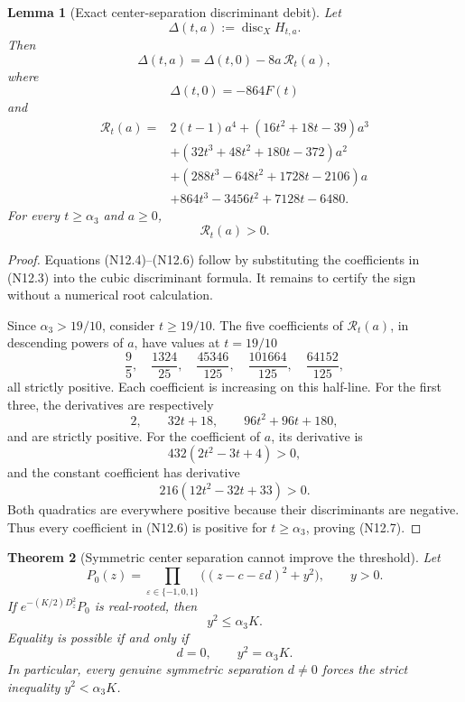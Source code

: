 \documentclass[11pt]{article}
\newtheorem{theorem}{Theorem}[section]
\newtheorem{lemma}[theorem]{Lemma}
\theoremstyle{definition}
\theoremstyle{remark}
\begin{document}
\begin{lemma}[Exact center-separation discriminant debit]
\label{lem:f2v12-debit}
Let
\[
 \Delta(t,a):=\operatorname{disc}_X H_{t,a}.
\]
Then
\[
 \boxed{
 \Delta(t,a)=\Delta(t,0)-8a\,\mathcal R_t(a),}
 \tag{N12.4}
\]
where
\[
 \Delta(t,0)=-864F(t)
 \tag{N12.5}
\]
and
\[
\begin{aligned}
 \mathcal R_t(a)={}&2(t-1)a^4
 +(16t^2+18t-39)a^3\\
 &+(32t^3+48t^2+180t-372)a^2\\
 &+(288t^3-648t^2+1728t-2106)a\\
 &+864t^3-3456t^2+7128t-6480.
\end{aligned}
\tag{N12.6}
\]
For every \(t\ge\alpha_3\) and \(a\ge0\),
\[
 \mathcal R_t(a)>0.
 \tag{N12.7}
\]
\end{lemma}

\begin{proof}
Equations \textup{(N12.4)}--\textup{(N12.6)} follow by substituting
the coefficients in \textup{(N12.3)} into the cubic discriminant formula.
It remains to certify the sign without a numerical root calculation.

Since \(\alpha_3>19/10\), consider \(t\ge19/10\).  The five coefficients
of \(\mathcal R_t(a)\), in descending powers of \(a\), have values at
\(t=19/10\)
\[
 \frac95,\quad
 \frac{1324}{25},\quad
 \frac{45346}{125},\quad
 \frac{101664}{125},\quad
 \frac{64152}{125},
 \tag{N12.8}
\]
all strictly positive.  Each coefficient is increasing on this half-line.  For the first three,
the derivatives are respectively
\[
 2,\qquad 32t+18,\qquad 96t^2+96t+180,
\]
and are strictly positive.  For the coefficient of \(a\), its derivative
is
\[
 432(2t^2-3t+4)>0,
\]
and the constant coefficient has derivative
\[
 216(12t^2-32t+33)>0.
\]
Both quadratics are everywhere positive because their discriminants are
negative.  Thus every coefficient in \textup{(N12.6)} is positive for
\(t\ge\alpha_3\), proving \textup{(N12.7)}.
\end{proof}

\begin{theorem}[Symmetric center separation cannot improve the threshold]
\label{thm:f2v12-separated}
Let
\[
 P_0(z)=
 \prod_{\varepsilon\in\{-1,0,1\}}
 \bigl((z-c-\varepsilon d)^2+y^2\bigr),
 \qquad y>0.
 \tag{N12.9}
\]
If \(e^{-(K/2)D_z^2}P_0\) is real-rooted, then
\[
 \boxed{y^2\le\alpha_3K.}
 \tag{N12.10}
\]
Equality is possible if and only if
\[
 d=0,\qquad y^2=\alpha_3K.
 \tag{N12.11}
\]
In particular, every genuine symmetric separation \(d\ne0\) forces the
strict inequality \(y^2<\alpha_3K\).
\end{theorem}
\end{document}
